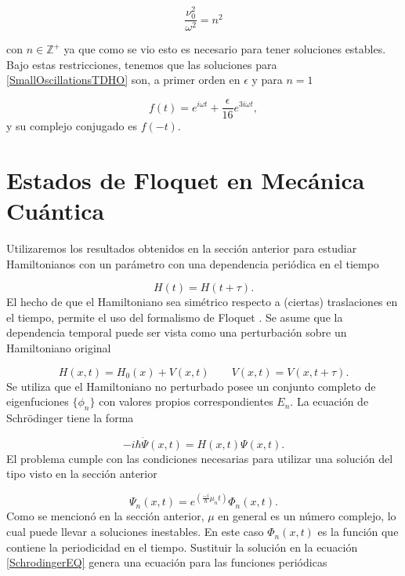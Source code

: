 \documentclass[10pt,a4paper]{report}
\begin{document}
\begin{equation}
\frac{\nu_0^2}{\omega^2} = n^2\label{scattering}
\end{equation}

con $n \in \mathbb{Z}^+$ ya que como se vio esto es necesario para tener soluciones estables\cite{WardFT}. Bajo estas restricciones, tenemos que las soluciones para \eqref{SmallOscillationsTDHO} son, a primer orden en $\epsilon$ y para $n=1$

\begin{equation}\label{SmallOscillationsSolution}
f(t)=  e^{i\omega t} + \frac{\epsilon}{16} e^{3i\omega t},
\end{equation} y su complejo conjugado es $f(-t)$.


\section{Estados de Floquet en Mecánica Cuántica}

Utilizaremos los resultados obtenidos en la
  sección anterior para estudiar Hamiltonianos con un parámetro con
  una dependencia periódica en el tiempo

\begin{equation} \label{TimeH}
H(t)=H(t+\tau).
\end{equation} El hecho de que el Hamiltoniano sea simétrico respecto a (ciertas) traslaciones en el tiempo, permite el uso del formalismo de Floquet \cite{HanngiDQS}. Se asume que la dependencia temporal puede ser vista como una perturbación sobre un Hamiltoniano original

\begin{equation}
H(x,t)=H_0(x)+V(x,t) \qquad V(x,t)=V(x,t+\tau).
\end{equation}
Se utiliza que el Hamiltoniano no perturbado posee un conjunto
completo de eigenfuciones $\{\phi_n\}$ con valores propios
correspondientes $E_n$.   La
ecuación de Schr\"{o}dinger tiene la forma

\begin{equation}\label{SchrodingerEQ}
-i\hbar\dot{\Psi}(x,t) = H(x,t)\Psi(x,t).
\end{equation} El problema cumple con las condiciones necesarias para utilizar una solución del tipo visto en la sección anterior

\begin{equation}
\Psi_n(x,t) = e^{(\frac{-i}{\hbar}\mu_nt)}\Phi_n(x,t).
\end{equation} Como se mencionó en la sección anterior, $\mu$ en general es un número complejo, lo cual puede llevar a soluciones inestables. En este caso $\Phi_n(x,t)$ es la función que contiene la periodicidad en el tiempo. Sustituir la solución en la ecuación \eqref{SchrodingerEQ} genera una ecuación para las funciones periódicas
\end{document}

